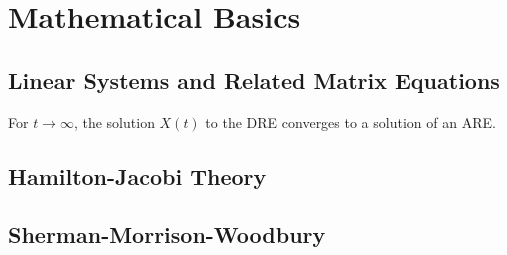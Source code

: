\chapter{Mathematical Basics}
\section{Linear Systems and Related Matrix Equations}

\begin{proposition}
\label{thm:basics:dre-limit-are}
  For $t\to\infty$, the solution $X(t)$ to the \ac{DRE} converges to a solution of an \ac{ARE}.
\end{proposition}

\section{Hamilton-Jacobi Theory}
\section{Sherman-Morrison-Woodbury}


